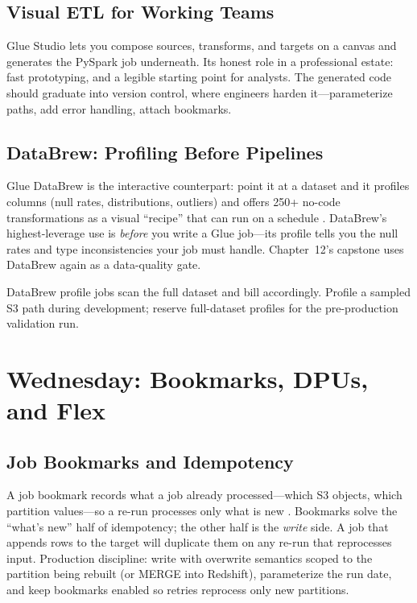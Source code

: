 \subsection{Visual ETL for Working Teams}
Glue Studio lets you compose sources, transforms, and targets on a canvas and generates the PySpark job underneath. Its honest role in a professional estate: fast prototyping, and a legible starting point for analysts. The generated code should graduate into version control, where engineers harden it---parameterize paths, add error handling, attach bookmarks.

\subsection{DataBrew: Profiling Before Pipelines}
Glue DataBrew is the interactive counterpart: point it at a dataset and it profiles columns (null rates, distributions, outliers) and offers 250+ no-code transformations as a visual ``recipe'' that can run on a schedule \cite{awsGlueDataBrewDocs}. DataBrew's highest-leverage use is \emph{before} you write a Glue job---its profile tells you the null rates and type inconsistencies your job must handle. Chapter~12's capstone uses DataBrew again as a data-quality gate.

\begin{tipbox}
DataBrew profile jobs scan the full dataset and bill accordingly. Profile a sampled S3 path during development; reserve full-dataset profiles for the pre-production validation run.
\end{tipbox}

\section{Wednesday: Bookmarks, DPUs, and Flex}
\subsection{Job Bookmarks and Idempotency}
A job bookmark records what a job already processed---which S3 objects, which partition values---so a re-run processes only what is new \cite{awsGlueDocs}. Bookmarks solve the ``what's new'' half of idempotency; the other half is the \emph{write} side. A job that appends rows to the target will duplicate them on any re-run that reprocesses input. Production discipline: write with overwrite semantics scoped to the partition being rebuilt (or MERGE into Redshift), parameterize the run date, and keep bookmarks enabled so retries reprocess only new partitions.

